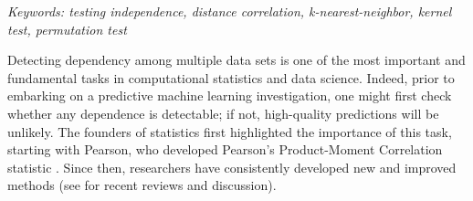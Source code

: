 \documentclass[11pt]{article}
\begin{document}
\noindent%
{\it Keywords: testing independence, distance correlation, k-nearest-neighbor, kernel test, permutation test}

\setcounter{tocdepth}{2}%





{}



Detecting dependency among multiple data sets is one of the most important and fundamental tasks in computational statistics and data science.
Indeed, prior to embarking on a predictive machine learning investigation, one might first check whether any dependence is detectable; if not, high-quality predictions will be unlikely.
The founders of statistics first highlighted the importance of this task, starting with Pearson, who developed Pearson's Product-Moment Correlation statistic  \cite{Pearson1895}.  Since then, researchers have consistently developed new and improved methods (see \cite{Reimherr2013,JosseHolmes2013} for  recent reviews and discussion).
\end{document}
